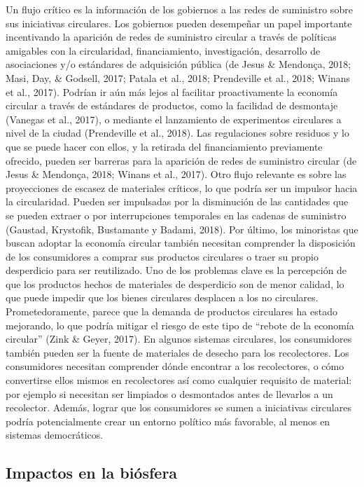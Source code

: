 \documentclass[runningheads]{llncs}
\begin{document}
Un flujo crítico es la información de los gobiernos a las redes de
suministro sobre sus iniciativas circulares. Los gobiernos pueden
desempeñar un papel importante incentivando la aparición de redes de
suministro circular a través de políticas amigables con la circularidad,
financiamiento, investigación, desarrollo de asociaciones y/o estándares
de adquisición pública (de Jesus \& Mendonça, 2018; Masi, Day, \&
Godsell, 2017; Patala et al., 2018; Prendeville et al., 2018; Winans et
al., 2017). Podrían ir aún más lejos al facilitar proactivamente la
economía circular a través de estándares de productos, como la facilidad
de desmontaje (Vanegas et al., 2017), o mediante el lanzamiento de
experimentos circulares a nivel de la ciudad (Prendeville et al., 2018).
Las regulaciones sobre residuos y lo que se puede hacer con ellos, y la
retirada del financiamiento previamente ofrecido, pueden ser barreras
para la aparición de redes de suministro circular (de Jesus \& Mendonça,
2018; Winans et al., 2017). Otro flujo relevante es sobre las
proyecciones de escasez de materiales críticos, lo que podría ser un
impulsor hacia la circularidad. Pueden ser impulsadas por la disminución
de las cantidades que se pueden extraer o por interrupciones temporales
en las cadenas de suministro (Gaustad, Krystofik, Bustamante y Badami,
2018). Por último, los minoristas que buscan adoptar la economía
circular también necesitan comprender la disposición de los consumidores
a comprar sus productos circulares o traer su propio desperdicio para
ser reutilizado. Uno de los problemas clave es la percepción de que los
productos hechos de materiales de desperdicio son de menor calidad, lo
que puede impedir que los bienes circulares desplacen a los no
circulares. Prometedoramente, parece que la demanda de productos
circulares ha estado mejorando, lo que podría mitigar el riesgo de este
tipo de ``rebote de la economía circular'' (Zink \& Geyer, 2017). En
algunos sistemas circulares, los consumidores también pueden ser la
fuente de materiales de desecho para los recolectores. Los consumidores
necesitan comprender dónde encontrar a los recolectores, o cómo
convertirse ellos mismos en recolectores así como cualquier requisito de
material: por ejemplo si necesitan ser limpiados o desmontados antes de
llevarlos a un recolector. Además, lograr que los consumidores se sumen
a iniciativas circulares podría potencialmente crear un entorno político
más favorable, al menos en sistemas democráticos.

\hypertarget{impactos-en-la-biuxf3sfera}{%
\subsection{Impactos en la biósfera}\label{impactos-en-la-biuxf3sfera}}
\end{document}

